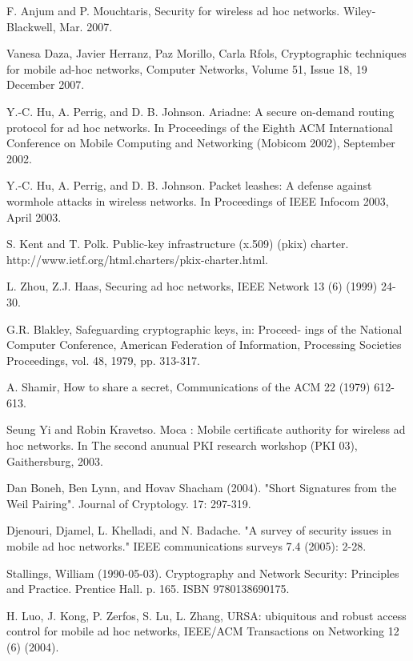 \documentclass[11pt,a4paper]{llncs}
\begin{document}
\begin{thebibliography}{4}

F. Anjum and P. Mouchtaris, Security for wireless ad
hoc networks. Wiley-Blackwell, Mar. 2007.

Vanesa Daza, Javier Herranz, Paz Morillo, Carla Rfols, Cryptographic techniques for mobile 
ad-hoc networks, Computer Networks, Volume 51, Issue 18, 19 December 2007.

Y.-C. Hu, A. Perrig, and D. B. Johnson. Ariadne: A secure on-demand routing protocol
for ad hoc networks. In Proceedings of the Eighth ACM International Conference on Mobile
Computing and Networking (Mobicom 2002), September 2002.

Y.-C. Hu, A. Perrig, and D. B. Johnson. Packet leashes: A defense against wormhole attacks
in wireless networks. In Proceedings of IEEE Infocom 2003, April 2003.

S. Kent and T. Polk. Public-key infrastructure (x.509) (pkix) charter.
http://www.ietf.org/html.charters/pkix-charter.html.

L. Zhou, Z.J. Haas, Securing ad hoc networks, IEEE
Network 13 (6) (1999) 24-30.

G.R. Blakley, Safeguarding cryptographic keys, in: Proceed-
ings of the National Computer Conference, American
Federation of Information, Processing Societies Proceedings,
vol. 48, 1979, pp. 313-317.

A. Shamir, How to share a secret, Communications of the
ACM 22 (1979) 612-613.

Seung Yi and Robin Kravetso. Moca : Mobile certificate authority for wireless ad hoc networks.
In The second anunual PKI research workshop (PKI 03), Gaithersburg, 2003.

Dan Boneh, Ben Lynn, and Hovav Shacham (2004). "Short Signatures from the Weil Pairing". Journal of Cryptology. 17: 297-319.


Djenouri, Djamel, L. Khelladi, and N. Badache. "A survey of security issues in mobile ad hoc networks." IEEE communications surveys 7.4 (2005): 2-28.

Stallings, William (1990-05-03). Cryptography and Network Security: Principles and Practice. Prentice Hall. p. 165. ISBN 9780138690175.

H. Luo, J. Kong, P. Zerfos, S. Lu, L. Zhang, URSA:
ubiquitous and robust access control for mobile ad hoc
networks, IEEE/ACM Transactions on Networking 12 (6)
(2004).



\end{thebibliography}
\end{document}

